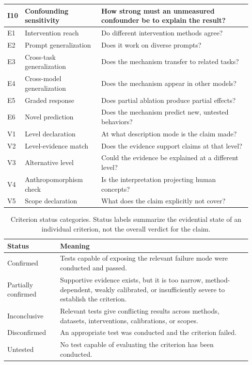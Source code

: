 \documentclass[10pt]{article}
\begin{document}
\begin{table}[H]
\begin{tabular}{@{}llp{8.5cm}@{}}
I10 & Confounding sensitivity & How strong must an unmeasured confounder be to explain the result? \\
\midrule
E1 & Intervention reach & Do different intervention methods agree? \\
E2 & Prompt generalization & Does it work on diverse prompts? \\
E3 & Cross-task generalization & Does the mechanism transfer to related tasks? \\
E4 & Cross-model generalization & Does the mechanism appear in other models? \\
E5 & Graded response & Does partial ablation produce partial effects? \\
E6 & Novel prediction & Does the mechanism predict new, untested behaviors? \\
\midrule
V1 & Level declaration & At what description mode is the claim made? \\
V2 & Level-evidence match & Does the evidence support claims at that level? \\
V3 & Alternative level & Could the evidence be explained at a different level? \\
V4 & Anthropomorphism check & Is the interpretation projecting human concepts? \\
V5 & Scope declaration & What does the claim explicitly not cover? \\
\bottomrule
\end{tabular}
\end{table}
\endgroup




\begingroup
{}
\begin{table}[H]
\centering
\small
\caption{Criterion status categories. Status labels summarize the evidential state of an individual criterion, not the overall verdict for the claim.}
\label{tab:criterion-status}
\renewcommand{\arraystretch}{1.15}
\begin{tabular}{@{}lp{10.5cm}@{}}
\toprule
\textbf{Status} & \textbf{Meaning} \\
\midrule
Confirmed & Tests capable of exposing the relevant failure mode were conducted and passed. \\
\midrule
Partially confirmed  & Supportive evidence exists, but it is too narrow, method-dependent, weakly calibrated, or insufficiently severe to establish the criterion. \\
\midrule
Inconclusive & Relevant tests give conflicting results across methods, datasets, interventions, calibrations, or scopes. \\
\midrule
Disconfirmed & An appropriate test was conducted and the criterion failed. \\
\midrule
Untested & No test capable of evaluating the criterion has been conducted. \\
\bottomrule
\end{tabular}
\end{table}
\endgroup
\end{document}
